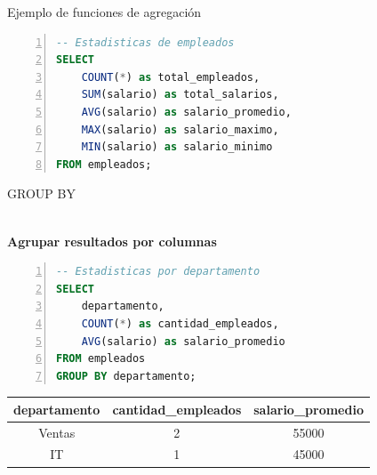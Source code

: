 \documentclass{beamer}
\begin{document}
\begin{frame}[fragile]{Ejemplo de funciones de agregación}
    \begin{lstlisting}[language=SQL, numbers=left, numbersep=5pt]
-- Estadisticas de empleados
SELECT 
    COUNT(*) as total_empleados,
    SUM(salario) as total_salarios,
    AVG(salario) as salario_promedio,
    MAX(salario) as salario_maximo,
    MIN(salario) as salario_minimo
FROM empleados;
    \end{lstlisting}
    
    \vspace{0.3cm}
    
    \begin{center}
    \end{center}
\end{frame}

\begin{frame}[fragile]{GROUP BY}
    \begin{center}
        {\Large \faUsers}\\[0.2cm]
        \textbf{Agrupar resultados por columnas}
    \end{center}
    
    \vspace{0.3cm}
    
    \begin{lstlisting}[language=SQL, numbers=left, numbersep=5pt]
-- Estadisticas por departamento
SELECT 
    departamento,
    COUNT(*) as cantidad_empleados,
    AVG(salario) as salario_promedio
FROM empleados
GROUP BY departamento;
    \end{lstlisting}
    
    \vspace{0.3cm}
    
    \begin{center}
        \begin{tabular}{ccc}
            \toprule
            departamento & cantidad\_empleados & salario\_promedio \\
            \midrule
            Ventas & 2 & 55000 \\
            IT & 1 & 45000 \\
            \bottomrule
        \end{tabular}
    \end{center}
\end{frame}
\end{document}
